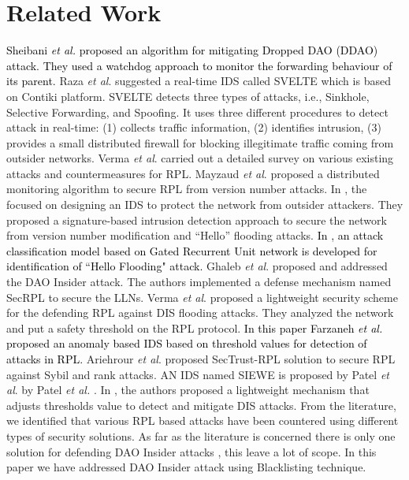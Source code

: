 \documentclass[conference, a4paper]{IEEEtran}
\begin{document}
\section{Related Work}\label{Sec:related work}
\textcolor{black}{Sheibani \textit{et al.} \cite{sheibani2022lightweight} proposed an algorithm for mitigating Dropped DAO (DDAO) attack. They used a watchdog approach to monitor the forwarding behaviour of its parent.} Raza \textit{et al}. \cite{raza2013svelte} suggested a real-time IDS called SVELTE which is based on Contiki platform. SVELTE detects three types of attacks, i.e., Sinkhole, Selective Forwarding, and Spoofing. It uses three different procedures to detect attack in real-time: (1) collects traffic information, (2) identifies intrusion, (3) provides a small distributed firewall for blocking illegitimate traffic coming from outsider networks. Verma \textit{et al}. \cite{verma2020security} carried out a detailed survey on various existing attacks and countermeasures for RPL. Mayzaud \textit{et al}. \cite{mayzaud2017distributed} proposed a distributed monitoring algorithm to secure RPL from version number attacks. 
In \cite{ioulianou2018signature}, the focused on  designing an IDS to protect the network from outsider attackers. They proposed a signature-based intrusion detection approach to secure the network from version number modification and ``Hello” flooding attacks. \textcolor{black}{In \cite{cakir2020rpl}, an attack classification model based on Gated Recurrent Unit network is developed for identification of ``Hello Flooding" attack.} Ghaleb \textit{et al}. \cite{ghaleb2018addressing} proposed and addressed the DAO Insider attack. The authors implemented a defense mechanism named SecRPL to secure the LLNs. 
Verma \textit{et al}. \cite{verma2020mitigation} proposed a lightweight security scheme for the defending RPL against DIS flooding attacks. They analyzed the network and put a safety threshold on the RPL protocol. \textcolor{black}{In this\cite{8765272} paper Farzaneh \textit{et al.} proposed an anomaly based IDS based on threshold values for detection of attacks in RPL.} Ariehrour \textit{et al}. \cite{airehrour2019sectrust} proposed SecTrust-RPL solution to secure RPL against Sybil and rank attacks. AN IDS named SIEWE is proposed by Patel \textit{et al}. by Patel \textit{et al.} \cite{patel2019blackhole}.  In \cite{guo2021lightweight}, the authors proposed a lightweight mechanism that adjusts thresholds value to detect and mitigate DIS attacks. From the literature, we identified that various RPL based attacks have been countered using different types of security solutions. As far as the literature is concerned there is only one solution for defending DAO Insider attacks \cite{ghaleb2018addressing}, this leave a lot of scope. In this paper we have addressed DAO Insider attack using Blacklisting technique.
\end{document}
